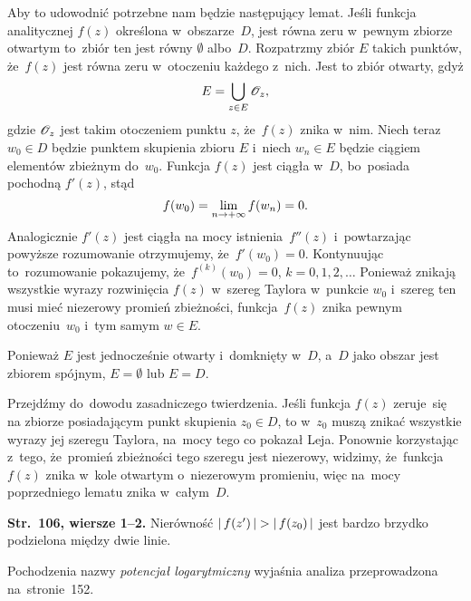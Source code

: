 \documentclass[a4paper,11pt]{article}
\begin{document}
Aby to udowodnić potrzebne nam będzie następujący lemat. Jeśli funkcja
analitycznej $f( z )$ określona w~obszarze~$D$, jest równa zeru
w~pewnym zbiorze otwartym to~zbiór ten jest równy $\emptyset$
albo~$D$. Rozpatrzmy zbiór $E$ takich punktów, że~$f( z )$ jest równa
zeru w~otoczeniu każdego z~nich. Jest to zbiór otwarty, gdyż
\begin{equation}
  \label{eq:Leja-41}
  E = \bigcup_{ z \in E } \mathcal{O}_{ z },
\end{equation}
gdzie $\mathcal{O}_{ z }$ jest takim otoczeniem punktu $z$, że~$f( z )$ znika
w~nim. Niech teraz $w_{ 0 } \in D$ będzie punktem skupienia zbioru $E$
i~niech $w_{ n } \in E$ będzie ciągiem elementów zbieżnym
do~$w_{ 0 }$. Funkcja $f( z )$ jest ciągła w~$D$, bo~posiada pochodną
$f'( z )$, stąd
\begin{equation}
  \label{eq:Leja-42}
  f( w_{ 0 } ) = \lim\limits_{ n \to +\infty } f( w_{ n } ) = 0.
\end{equation}
Analogicznie $f'( z )$ jest ciągła na mocy istnienia~$f''( z )$
i~powtarzając powyższe rozumowanie otrzymujemy,
że~$f'( w_{ 0 } ) = 0$. Kontynuując to~rozumowanie pokazujemy,
że~$f^{ ( k ) }( w_{ 0 } ) = 0$, $k = 0, 1, 2, \ldots$ Ponieważ
znikają wszystkie wyrazy rozwinięcia $f( z )$ w~szereg Taylora
w~punkcie $w_{ 0 }$ i~szereg ten musi mieć niezerowy promień
zbieżności, funkcja~$f( z )$ znika pewnym otoczeniu~$w_{ 0 }$ i~tym
samym $w \in E$.

Ponieważ $E$ jest jednocześnie otwarty i~domknięty w~$D$, a~$D$ jako
obszar jest zbiorem spójnym, $E = \emptyset$ lub $E = D$.

Przejdźmy do~dowodu zasadniczego twierdzenia. Jeśli funkcja $f( z )$
zeruje~się na zbiorze posiadającym punkt skupienia $z_{ 0 } \in D$, to
w~$z_{ 0 }$ muszą znikać wszystkie wyrazy jej szeregu Taylora, na~mocy
tego co pokazał Leja. Ponownie korzystając z~tego, że~promień
zbieżności tego szeregu jest niezerowy, widzimy, że~funkcja~$f( z )$
znika w~kole otwartym o~niezerowym promieniu, więc na~mocy
poprzedniego lematu znika w~całym~$D$.

\vspace{\spaceFour}


\start \textbf{Str.~106, wiersze 1--2.} Nierówność
$\left| \,  f( z' )  \, \right| > \left| \,  f( z_{ 0 } )  \, \right|$ jest bardzo brzydko
podzielona między dwie linie.

\vspace{\spaceFour}


\start {} Pochodzenia nazwy \emph{potencjał logarytmiczny}
wyjaśnia analiza przeprowadzona na~stronie~152.
\end{document}
